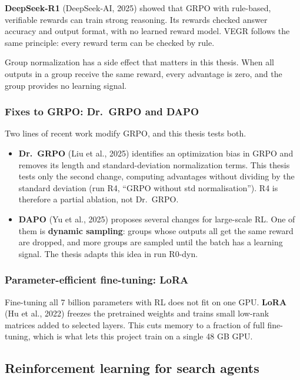\textbf{DeepSeek-R1} (DeepSeek-AI, 2025) showed that GRPO with
rule-based, verifiable rewards can train strong reasoning. Its rewards
checked answer accuracy and output format, with no learned reward model.
VEGR follows the same principle: every reward term can be checked by
rule.

Group normalization has a side effect that matters in this thesis. When
all outputs in a group receive the same reward, every advantage is zero,
and the group provides no learning signal.

\subsubsection{Fixes to GRPO: Dr.~GRPO and DAPO}\label{sec:2.5.3}

Two lines of recent work modify GRPO, and this thesis tests both.

\begin{itemize}
\tightlist
\item
  \textbf{Dr.~GRPO} (Liu et al., 2025) identifies an optimization bias
  in GRPO and removes its length and standard-deviation normalization
  terms. This thesis tests only the second change, computing advantages
  without dividing by the standard deviation (run R4, ``GRPO without std
  normalisation''). R4 is therefore a partial ablation, not Dr.~GRPO.
\item
  \textbf{DAPO} (Yu et al., 2025) proposes several changes for
  large-scale RL. One of them is \textbf{dynamic sampling}: groups whose
  outputs all get the same reward are dropped, and more groups are
  sampled until the batch has a learning signal. The thesis adapts this
  idea in run R0-dyn.
\end{itemize}

\subsubsection{Parameter-efficient fine-tuning: LoRA}\label{sec:2.5.4}

Fine-tuning all 7 billion parameters with RL does not fit on one GPU.
\textbf{LoRA} (Hu et al., 2022) freezes the pretrained weights and
trains small low-rank matrices added to selected layers. This cuts
memory to a fraction of full fine-tuning, which is what lets this
project train on a single 48 GB GPU.

\subsection{Reinforcement learning for search agents}\label{sec:2.6}

